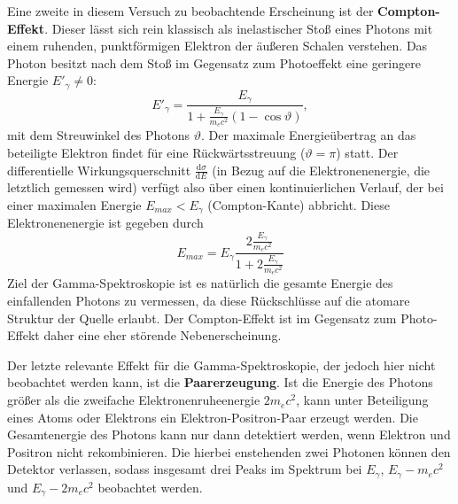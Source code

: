 Eine zweite in diesem Versuch zu beobachtende Erscheinung ist der \textbf{Compton-Effekt}. Dieser lässt sich rein
klassisch als inelastischer Stoß eines Photons mit einem ruhenden, punktförmigen Elektron der äußeren Schalen verstehen.
Das Photon besitzt nach dem Stoß im Gegensatz zum Photoeffekt eine geringere Energie $E'_\gamma \neq 0$:
\begin{equation}
    {E'}_{\!\gamma} = \frac{E_\gamma}{1 + \frac{E_\gamma}{m_e c^2} \left(1 - \cos\vartheta \right)},
    \label{eq:rückstreu}
\end{equation}
mit dem Streuwinkel des Photons $\vartheta$. Der maximale Energieübertrag an das beteiligte Elektron findet für eine
Rückwärtsstreuung ($\vartheta = \pi$) statt. Der differentielle Wirkungsquerschnitt $\frac{\mathup{d}\sigma}{\mathup{d}E}$
(in Bezug auf die Elektronenenergie, die letztlich gemessen wird) verfügt also über einen kontinuierlichen Verlauf, der
bei einer maximalen Energie $E_{max} < E_\gamma$ (Compton-Kante) abbricht. Diese Elektronenenergie ist gegeben durch
\begin{equation}
    E_{max} = E_\gamma \frac{2\frac{E_\gamma}{m_ec^2}}{1 + 2\frac{E_\gamma}{m_ec^2}}
    \label{eq: comptonkante_energie}
\end{equation}
Ziel der Gamma-Spektroskopie ist es natürlich die
gesamte Energie des einfallenden Photons zu vermessen, da diese Rückschlüsse auf die atomare Struktur der Quelle
erlaubt. Der Compton-Effekt ist im Gegensatz zum Photo-Effekt daher eine eher störende Nebenerscheinung.

Der letzte relevante Effekt für die Gamma-Spektroskopie, der jedoch hier nicht beobachtet werden kann, ist die
\textbf{Paarerzeugung}. Ist die Energie des Photons größer als die zweifache Elektronenruheenergie $2m_ec^2$,
kann unter Beteiligung eines Atoms oder Elektrons ein Elektron-Positron-Paar erzeugt werden. Die Gesamtenergie
des Photons kann nur dann detektiert werden, wenn Elektron und Positron nicht rekombinieren. Die hierbei enstehenden
zwei Photonen können den Detektor verlassen, sodass insgesamt drei Peaks im Spektrum bei $E_\gamma$, $E_\gamma - m_ec^2$ und
$E_\gamma - 2m_ec^2$ beobachtet werden.

